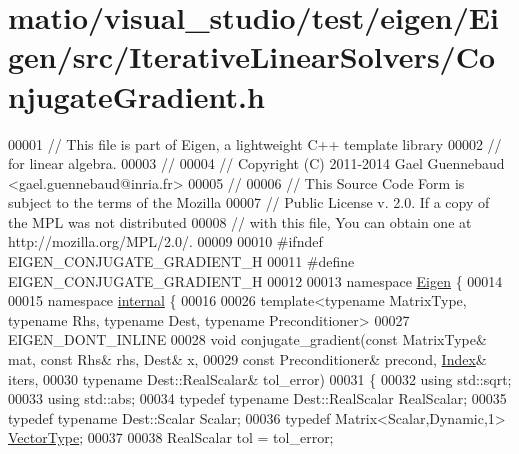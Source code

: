 \hypertarget{matio_2visual__studio_2test_2eigen_2_eigen_2src_2_iterative_linear_solvers_2_conjugate_gradient_8h_source}{}\section{matio/visual\+\_\+studio/test/eigen/\+Eigen/src/\+Iterative\+Linear\+Solvers/\+Conjugate\+Gradient.h}
\label{matio_2visual__studio_2test_2eigen_2_eigen_2src_2_iterative_linear_solvers_2_conjugate_gradient_8h_source}

\begin{DoxyCode}
00001 \textcolor{comment}{// This file is part of Eigen, a lightweight C++ template library}
00002 \textcolor{comment}{// for linear algebra.}
00003 \textcolor{comment}{//}
00004 \textcolor{comment}{// Copyright (C) 2011-2014 Gael Guennebaud <gael.guennebaud@inria.fr>}
00005 \textcolor{comment}{//}
00006 \textcolor{comment}{// This Source Code Form is subject to the terms of the Mozilla}
00007 \textcolor{comment}{// Public License v. 2.0. If a copy of the MPL was not distributed}
00008 \textcolor{comment}{// with this file, You can obtain one at http://mozilla.org/MPL/2.0/.}
00009 
00010 \textcolor{preprocessor}{#ifndef EIGEN\_CONJUGATE\_GRADIENT\_H}
00011 \textcolor{preprocessor}{#define EIGEN\_CONJUGATE\_GRADIENT\_H}
00012 
00013 \textcolor{keyword}{namespace }\hyperlink{namespace_eigen}{Eigen} \{ 
00014 
00015 \textcolor{keyword}{namespace }\hyperlink{namespaceinternal}{internal} \{
00016 
00026 \textcolor{keyword}{template}<\textcolor{keyword}{typename} MatrixType, \textcolor{keyword}{typename} Rhs, \textcolor{keyword}{typename} Dest, \textcolor{keyword}{typename} Preconditioner>
00027 EIGEN\_DONT\_INLINE
00028 \textcolor{keywordtype}{void} conjugate\_gradient(\textcolor{keyword}{const} MatrixType& mat, \textcolor{keyword}{const} Rhs& rhs, Dest& x,
00029                         \textcolor{keyword}{const} Preconditioner& precond, \hyperlink{namespace_eigen_a62e77e0933482dafde8fe197d9a2cfde}{Index}& iters,
00030                         \textcolor{keyword}{typename} Dest::RealScalar& tol\_error)
00031 \{
00032   \textcolor{keyword}{using} std::sqrt;
00033   \textcolor{keyword}{using} std::abs;
00034   \textcolor{keyword}{typedef} \textcolor{keyword}{typename} Dest::RealScalar RealScalar;
00035   \textcolor{keyword}{typedef} \textcolor{keyword}{typename} Dest::Scalar Scalar;
00036   \textcolor{keyword}{typedef} Matrix<Scalar,Dynamic,1> \hyperlink{struct_vector_type}{VectorType};
00037   
00038   RealScalar tol = tol\_error;

\end{DoxyCode}
